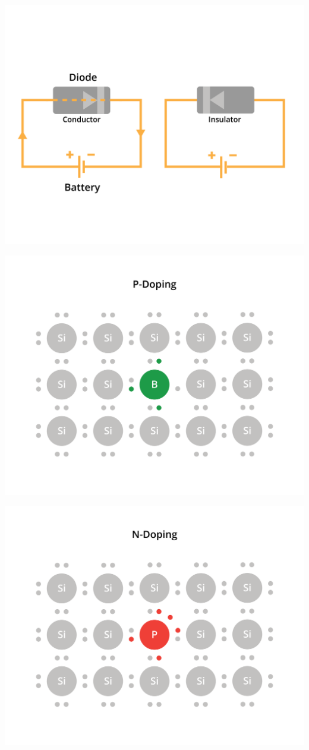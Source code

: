 \documentclass{article}
\begin{document}
\includegraphics[width=.75\textwidth]{diodeIntroAlt.png}


\includegraphics[width=.75\textwidth]{doping-26.png}

\includegraphics[width=.75\textwidth]{doping-27.png}
\end{document}
